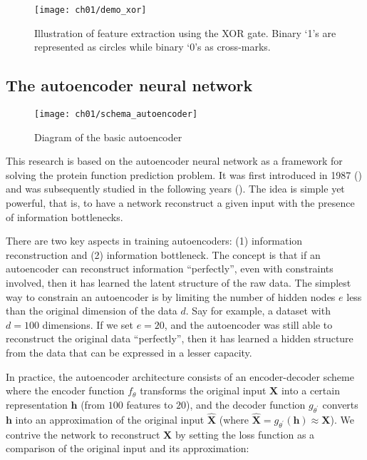 \begin{figure}[!t]
  \centering
  \texttt{[image: ch01/demo\_xor]}
  \caption[Illustration of feature extraction using the XOR gate]
    {Illustration of feature extraction using the XOR gate. Binary `1's are represented as
    circles while binary `0's as cross-marks.}
  \label{demo:xor}
\end{figure}

\subsection{The autoencoder neural network}

\begin{wrapfigure}{r}{0.5\textwidth}
  \centering
  \texttt{[image: ch01/schema\_autoencoder]}
  \caption[Diagram of the basic autoencoder]{
      Diagram of the basic autoencoder
  }
  \label{schema:autoencoder}
\end{wrapfigure}

\par This research is based on the autoencoder neural network as a framework
for solving the protein function prediction problem. It was first introduced
in 1987 (\cite{lecun1987phd}) and was subsequently studied in the following
years (\cite{bourlard1988auto, hinton1994autoencoders}). The idea is simple
yet powerful, that is, to have a network reconstruct a given input with the
presence of information bottlenecks.

\par There are two key aspects in training autoencoders: (1) information
reconstruction and (2) information bottleneck. The concept is that if an
autoencoder can reconstruct information ``perfectly'', even with
constraints involved, then it has learned the latent structure of the raw
data. The simplest way to constrain an autoencoder is by limiting the number
of hidden nodes $e$ less than the original dimension of the data $d$. Say for
example, a dataset with $d=100$ dimensions. If we set $e=20$, and the
autoencoder was still able to reconstruct the original data ``perfectly'', then
it has learned a hidden structure from the data that can be expressed in a
lesser capacity.

\par In practice, the autoencoder architecture consists of an encoder-decoder
scheme where the encoder function $f_{\theta}$ transforms the original input
$\mathbf{X}$ into a certain representation $\mathbf{h}$ (from $100$ features
to $20$), and the decoder function $g_{\theta^{\prime}}$ converts
$\mathbf{h}$ into an approximation of the original input
$\mathbf{\widehat{X}}$ (where $\mathbf{\widehat{X}} =
g_{\theta^{\prime}}(\mathbf{h}) \approx \mathbf{X}$). We contrive the network
to reconstruct $\mathbf{X}$ by setting the loss function as a comparison of
the original input and its approximation:

